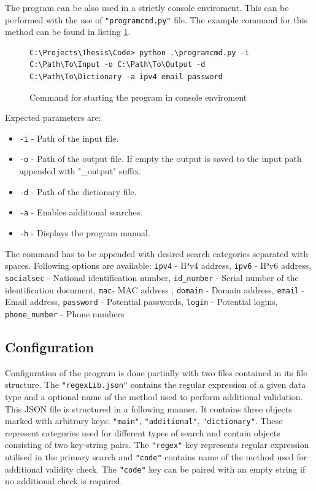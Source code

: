 \documentclass[a4paper,twoside,12pt]{book}
\begin{document}
The program can be also used in a strictly console enviroment. This can be performed with the use of \lstinline|"programcmd.py"|
file. The example command for this method can be found in listing \ref{fig:startCommandCMD}.


\begin{figure}
\centering
\begin{lstlisting}
C:\Projects\Thesis\Code> python .\programcmd.py -i C:\Path\To\Input -o C:\Path\To\Output -d C:\Path\To\Dictionary -a ipv4 email password
\end{lstlisting}
\caption{Command for starting the program in console enviroment}
\label{fig:startCommandCMD}
\end{figure}

Expected parameters are:
\begin{itemize}
   \item \lstinline|-i| - Path of the input file.
   \item \lstinline|-o| - Path of the output file. If empty the output is saved to the input path appended with "\_output" suffix.
   \item \lstinline|-d| - Path of the dictionary file.
   \item \lstinline|-a| - Enables additional searches.
   \item \lstinline|-h| - Displays the program manual.
\end{itemize}

The command has to be appended with desired search categories separated with spaces. Following options are available: \lstinline|ipv4| - IPv4 address,
\lstinline|ipv6| - IPv6 address, \lstinline|socialsec| - National identification number, \lstinline|id_number| - Serial number of the identification document, \lstinline|mac|- MAC address
, \lstinline|domain| - Domain address, \lstinline|email| - Email address, \lstinline|password| - Potential passwords, \lstinline|login| - Potential logins, \lstinline|phone_number| - Phone numbers

\subsection{Configuration}

Configuration of the program is done partially with two files contained in its
file structure. The \lstinline|"regexLib.json"| contains the regular expression of a given
data type and a optional name of the method used to perform additional 
validation. This JSON file is structured in a following manner. It contains
three objects marked with arbitrary keys: \lstinline|"main"|, \lstinline|"additional"|, \lstinline|"dictionary"|.
These represent categories used for different types of search and contain
objects consisting of two key-string pairs. The \lstinline|"regex"| key represents regular
expression utilised in the primary search and \lstinline|"code"| contains name of the method 
used for additional validity check. The \lstinline|"code"| key can be paired with an empty string
if no additional check is required.
\end{document}
